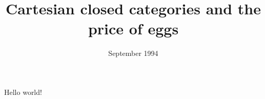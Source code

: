 \documentclass{article}
\title{Cartesian closed categories and the price of eggs}
\author{\VAR{name}}
\date{September 1994}
\begin{document}
   \maketitle
   Hello world!
\end{document}
